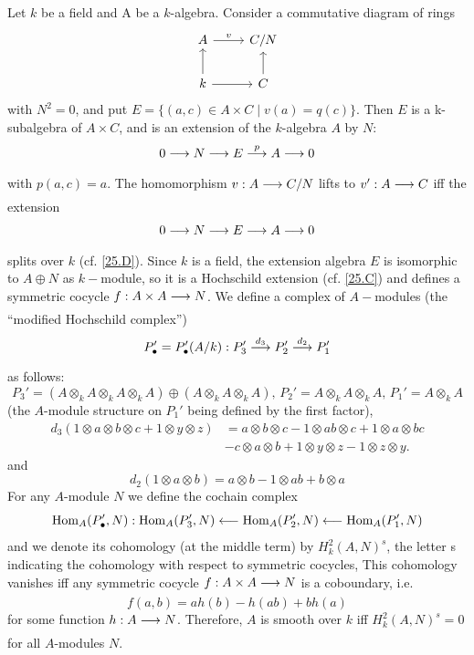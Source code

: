 \documentclass[../main]{subfiles}
\begin{document}
\newparagraph Let $k$ be a field and A be a $k$-algebra. Consider a commutative diagram of rings
\[\begin{tikzcd}
	A & {C/N} \\
	k & C
	\arrow[from=2-1, to=1-1]
	\arrow["v", from=1-1, to=1-2]
	\arrow[from=2-2, to=1-2]
	\arrow[from=2-1, to=2-2]
\end{tikzcd}\]
with $N^2=0$, and put $E=\{(a, c) \in A \times C \mid v(a)=q(c)\}$. Then $E$ is a k-subalgebra of $A \times C$, and is an extension of the $k$-algebra $A$ by $N$: \[ 0 \varrightarrow{} N \varrightarrow{} E \varrightarrow{p} A \varrightarrow{} 0\] with $p(a, c)=a$. The homomorphism $v: A \varrightarrow{} C / N$ lifts to $v': A \varrightarrow{} C$ iff the extension \[0 \varrightarrow{} N \varrightarrow{} E \varrightarrow{} A \varrightarrow{} 0\] splits over $k$ (cf. \ref{25.D}). Since $k$ is a field, the extension algebra $E$ is isomorphic to $A \oplus N$ as $k-$module, so it is a Hochschild extension (cf. \ref{25.C}) and defines a symmetric cocycle $f: A \times A \varrightarrow{} N$. We define a complex of $A-$modules (the ``modified Hochschild complex'') \[P_\bullet' = P_\bullet'(A/k): P_3' \varrightarrow{d_3} P_2' \varrightarrow{d_2}P_1'\] as follows: \[P_3' = (A\otimes_k A\otimes_k A\otimes_k A)\oplus (A\otimes_k A\otimes_k A),\, P_2' =A\otimes_k A\otimes_k A,\, P_1'=A\otimes_k A\] (the $A$-module structure on $P_1'$ being defined by the first factor),
\[\begin{aligned}
d_3(1\otimes a \otimes b \otimes c+1\otimes y \otimes z)& = a\otimes b \otimes c - 1 \otimes ab \otimes c +1\otimes a \otimes bc \\&-c \otimes a \otimes b+ 1 \otimes y \otimes z - 1\otimes z \otimes y.
\end{aligned}\]
and
\[d_2(1\otimes a \otimes b)= a\otimes b -1\otimes ab + b\otimes a\]
For any $A$-module $N$ we define the cochain complex
\[
\operatorname{Hom}_A(P_\bullet', N): \operatorname{Hom}_A(P_3', N)\longleftarrow\operatorname{Hom}_A(P_2', N)\longleftarrow\operatorname{Hom}_A(P_1', N)
\]
and we denote its cohomology (at the middle term) by $H_k^2(A, N)^s$, the letter s indicating the cohomology with respect to
symmetric cocycles, This cohomology vanishes iff any symmetric cocycle $f: A \times A \varrightarrow{} N$ is a coboundary, i.e.
\[f(a, b)=a h(b)-h(a b)+b h(a)\] for some function $h: A \varrightarrow{} N$.
Therefore, $A$ is smooth over $k$ iff $H_k^2(A, N)^s=0$ for all $A$-modules $N$.
\end{document}
